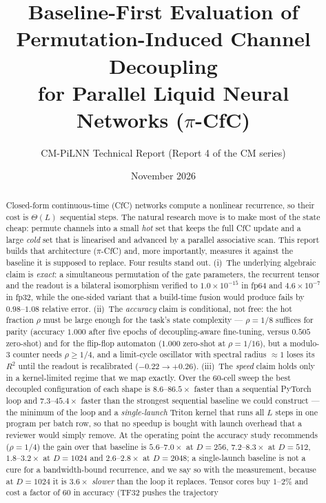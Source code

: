 \documentclass[11pt]{article}
\title{\textbf{Baseline-First Evaluation of Permutation-Induced Channel Decoupling\\
for Parallel Liquid Neural Networks ($\pi$-CfC)}}
\author{CM-PiLNN Technical Report \textnormal{(Report 4 of the CM series)}}
\date{November 2026}
\theoremstyle{definition}
\newcommand{\piCfC}{\ensuremath{\pi}-CfC}
\begin{document}
\maketitle

\begin{abstract}
Closed-form continuous-time (CfC) networks compute a nonlinear recurrence, so their cost is
$\Theta(L)$ sequential steps. The natural research move is to make most of the state cheap: permute channels
into a small \emph{hot} set that keeps the full CfC update and a large \emph{cold} set that is linearised and
advanced by a parallel associative scan. This report builds that architecture (\piCfC{}) and, more
importantly, measures it against the baseline it is supposed to replace. Four results stand out.
(i)~The underlying algebraic claim is \emph{exact}: a simultaneous permutation of the gate parameters,
the recurrent tensor and the readout is a bilateral isomorphism verified to $1.0\times10^{-15}$ in fp64 and
$4.6\times10^{-7}$ in fp32, while the one-sided variant that a build-time fusion would produce fails by
$0.98$--$1.08$ relative error. (ii)~The \emph{accuracy} claim is conditional, not free: the hot fraction
$\rho$ must be large enough for the task's state complexity --- $\rho=1/8$ suffices for parity
(accuracy $1.000$ after five epochs of decoupling-aware fine-tuning, versus $0.505$ zero-shot) and for the
flip-flop automaton ($1.000$ zero-shot at $\rho=1/16$), but a modulo-3 counter needs $\rho\ge1/4$, and a
limit-cycle oscillator with spectral radius $\approx1$ loses its $R^2$ until the readout is recalibrated
($-0.22\to+0.26$). (iii)~The \emph{speed} claim holds only in a kernel-limited regime that we map exactly. Over the
60-cell sweep the best decoupled configuration of each shape is $8.6$--$86.5\times$ faster than a
sequential PyTorch loop and $7.3$--$45.4\times$ faster than the strongest sequential baseline we could
construct --- the minimum of the loop and a \emph{single-launch} Triton kernel that runs all $L$ steps in
one program per batch row, so that no speedup is bought with launch overhead that a reviewer would simply
remove. At the operating point the accuracy study recommends ($\rho=1/4$) the gain over that baseline is
$5.6$--$7.0\times$ at $D=256$, $7.2$--$8.3\times$ at $D=512$, $1.8$--$3.2\times$ at $D=1024$ and
$2.6$--$2.8\times$ at $D=2048$; a single-launch baseline is not a cure for a bandwidth-bound recurrence,
and we say so with the measurement, because at $D=1024$ it is $3.6\times$ \emph{slower} than the loop it
replaces. Tensor cores buy $1$--$2\%$ and cost a factor of $60$ in accuracy (TF32 pushes the trajectory

\end{abstract}
\end{document}
